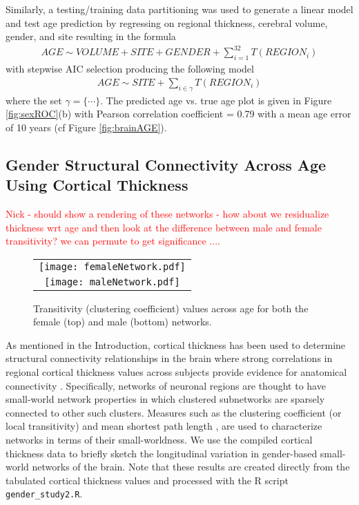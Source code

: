 Similarly, a testing/training data partitioning was used to generate a linear model 
and test age prediction by regressing on regional thickness,
cerebral volume, gender, and site resulting in the formula
\begin{align}
  AGE \sim VOLUME + SITE + GENDER + \sum_{i=1}^{32} T(REGION_{i})
\end{align}
with stepwise AIC selection producing the following model
\begin{align}
  AGE \sim SITE + \sum_{i\in\gamma} T(REGION_{i})
\end{align}
where the set $\gamma = \{\cdots\}$.  The predicted age vs. true age plot is given
in Figure \ref{fig:sexROC}(b) with Pearson correlation coefficient = 0.79 with a mean
age error of 10 years (cf Figure \ref{fig:brainAGE}).


\subsection{Gender Structural Connectivity Across Age Using Cortical Thickness}

\textcolor{red}{ Nick - should show a rendering of these networks -
  how about we residualize thickness wrt age and then look at the
  difference between male and female transitivity?  we can permute to
  get significance .... } 

\begin{figure*}
  \centering
  \begin{tabular}{c}
  \texttt{[image: femaleNetwork.pdf]} \\
  \texttt{[image: maleNetwork.pdf]}
  \end{tabular}
  \caption{Transitivity (clustering coefficient) values across age for both the female (top)
  and male (bottom) networks.  
  }
  \label{fig:network}
\end{figure*}

As mentioned in the Introduction, cortical thickness has
been used to determine structural connectivity relationships in the brain 
where strong correlations in regional cortical 
thickness values across subjects provide evidence for anatomical
connectivity \citep{he2007,chen2008,he2008}.  Specifically, networks of neuronal
regions are thought to have small-world network properties \citep{sporns2004} 
in which clustered subnetworks are sparsely connected to other such clusters.
Measures such as the
clustering coefficient (or local transitivity) and mean shortest path length
\citep{watts1998}, are used to characterize networks in terms of their 
small-worldness.
We use the compiled cortical thickness data to briefly sketch
the longitudinal variation in gender-based small-world networks of the
brain.  Note that these results are created directly from the tabulated 
cortical thickness values and processed with the R script
\verb#gender_study2.R#.

